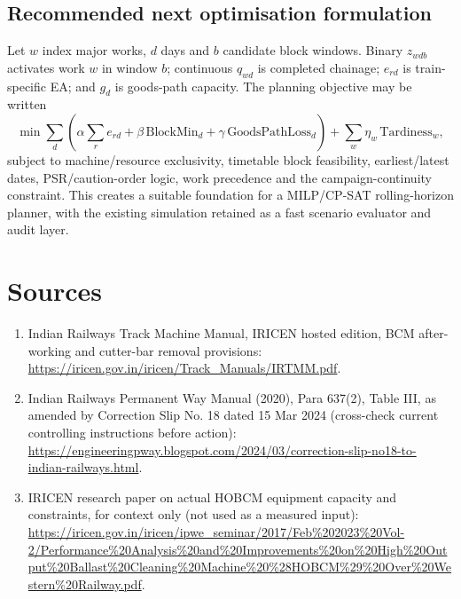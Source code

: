 \documentclass[10pt,a4paper]{article}
\begin{document}
\subsection{Recommended next optimisation formulation}
Let $w$ index major works, $d$ days and $b$ candidate block windows. Binary $z_{wdb}$ activates work $w$ in window $b$; continuous $q_{wd}$ is completed chainage; $e_{rd}$ is train-specific EA; and $g_d$ is goods-path capacity. The planning objective may be written
\begin{equation}
 \min \sum_d\left(\alpha\sum_r e_{rd}+\beta\,\mathrm{BlockMin}_d+\gamma\,\mathrm{GoodsPathLoss}_d\right)+\sum_w \eta_w\,\mathrm{Tardiness}_w,
\end{equation}
subject to machine/resource exclusivity, timetable block feasibility, earliest/latest dates, PSR/caution-order logic, work precedence and the campaign-continuity constraint. This creates a suitable foundation for a MILP/CP-SAT rolling-horizon planner, with the existing simulation retained as a fast scenario evaluator and audit layer.

\section{Sources}\label{sec:refs}
\begin{enumerate}
\item Indian Railways Track Machine Manual, IRICEN hosted edition, BCM after-working and cutter-bar removal provisions: \url{https://iricen.gov.in/iricen/Track_Manuals/IRTMM.pdf}.
\item Indian Railways Permanent Way Manual (2020), Para 637(2), Table III, as amended by Correction Slip No. 18 dated 15 Mar 2024 (cross-check current controlling instructions before action): \url{https://engineeringpway.blogspot.com/2024/03/correction-slip-no18-to-indian-railways.html}.
\item IRICEN research paper on actual HOBCM equipment capacity and constraints, for context only (not used as a measured input): \url{https://iricen.gov.in/iricen/ipwe_seminar/2017/Feb%202023%20Vol-2/Performance%20Analysis%20and%20Improvements%20on%20High%20Output%20Ballast%20Cleaning%20Machine%20%28HOBCM%29%20Over%20Western%20Railway.pdf}.
\end{enumerate}
\end{document}
